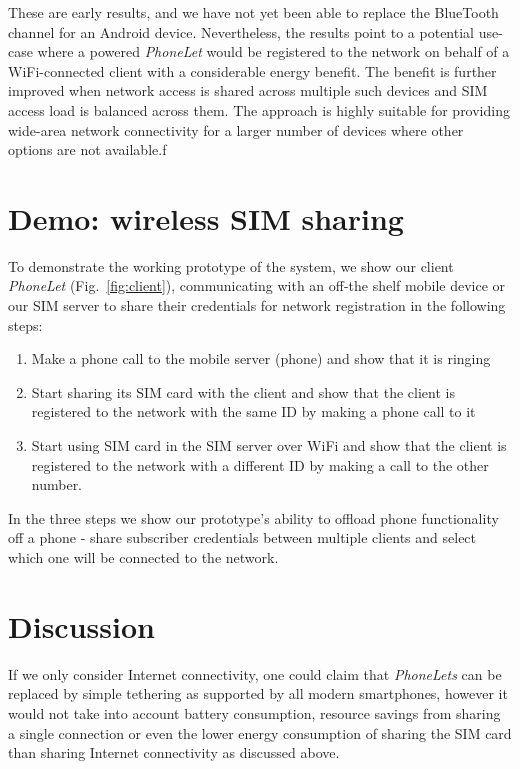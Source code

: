 \documentclass{sig-alternate-10pt}
\begin{document}
These are early results, and we have not yet been able to replace the BlueTooth channel for an Android device. Nevertheless, the results point to a potential use-case where a powered \emph{PhoneLet} would be registered to the network on behalf of a WiFi-connected client with a considerable energy benefit. The benefit is further improved when network access is shared across multiple such devices and SIM access load is balanced across them. The approach is highly suitable for providing wide-area network connectivity for a larger number of devices where other options are not available.f

\section{Demo: wireless SIM sharing}

To demonstrate the working prototype of the system, we show our client \emph{PhoneLet} (Fig.~\ref{fig:client}), communicating with an off-the shelf mobile device or our SIM server to share their credentials for network registration in the following steps:

\begin{enumerate}
    \item Make a phone call to the mobile server (phone) and show that it is ringing
    \item Start sharing its SIM card with the client and show that the client is registered to the network with the same ID by making a phone call to it
    \item Start using SIM card in the SIM server over WiFi and show that the client is registered to the network with a different ID by making a call to the other number.
\end{enumerate}

In the three steps we show our prototype's ability to offload phone functionality off a phone - share subscriber credentials between multiple clients and select which one will be connected to the network.

\section{Discussion}

If we only consider Internet connectivity, one could claim that \emph{PhoneLets} can be replaced by simple tethering as supported by all modern smartphones, however it would not take into account battery consumption, resource savings from sharing a single connection or even the lower energy consumption of sharing the SIM card than sharing Internet connectivity as discussed above.
\end{document}
